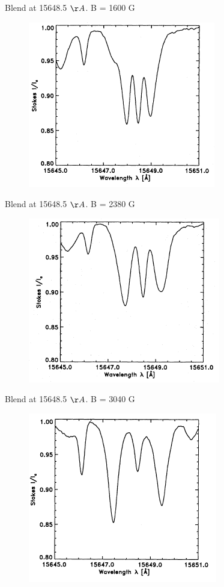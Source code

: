 \documentclass{beamer}
\begin{document}
\begin{frame}{Blend at 15648.5 $\AA$. B = 1600 G}
\begin{figure}[H]
 \centering
 \includegraphics[scale=0.8]{stokesI-2.png}
\end{figure}
\end{frame}
\begin{frame}{Blend at 15648.5 $\AA$. B = 2380 G}
\begin{figure}[H]
 \centering
 \includegraphics[scale=0.8]{stokesI-3.png}
\end{figure}
\end{frame}
\begin{frame}{Blend at 15648.5 $\AA$. B = 3040 G}
\begin{figure}[H]
 \centering
 \includegraphics[scale=0.8]{stokesI-4.png}
\end{figure}
\end{frame}
\end{document}
